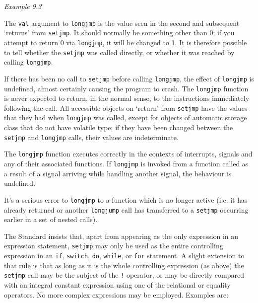   \begin{center}\textit{Example 9.3}\end{center}


  The \texttt{val} argument to \texttt{longjmp} is the value seen in
   the  second and subsequent `returns' from \texttt{setjmp}.  It
   should normally be something other than 0; if  you  attempt  to  return
   0  via \texttt{longjmp},  it will be changed to 1.  It is therefore
   possible to tell whether the \texttt{setjmp} was called directly,  or
   whether it was reached by calling \texttt{longjmp}.


  If there has been no call to \texttt{setjmp} before calling
   \texttt{longjmp}, the effect of \texttt{longjmp} is undefined,
   almost certainly causing the  program  to  crash.   The
   \texttt{longjmp}  function  is  never expected to return, in the normal
   sense, to the instructions immediately following the call.  All accessible
   objects  on `return'  from  \texttt{setjmp}  have  the  values
   that they had when \texttt{longjmp} was called, except for objects of
   automatic  storage class  that  do  not  have  volatile type; if they have
   been changed between the \texttt{setjmp} and \texttt{longjmp} calls,
   their  values are indeterminate.


  The \texttt{longjmp} function executes correctly in the  contexts  of
   interrupts,  signals  and any of their associated functions.  If
   \texttt{longjmp} is invoked from a function called as a result  of
   a   signal  arriving  while  handling  another  signal,  the behaviour is
   undefined.


  It's a serious error to \texttt{longjmp} to a function  which  is  no
   longer  active  (i.e.  it  has  already  returned or another
   \texttt{longjump} call has transferred to a \texttt{setjmp}
   occurring  earlier in a set of nested calls).


  The Standard insists that, apart from appearing as the  only expression
   in  an  expression statement, \texttt{setjmp} may only be used as the
   entire controlling expression in an \texttt{if}, \texttt{switch},
   \texttt{do}, \texttt{while},  or  \texttt{for}  statement.
   A slight extension to that rule is  that  as  long  as  it  is  the  whole
   controlling expression  (as above) the \texttt{setjmp} call may be the
   subject of the \texttt{!}   operator,  or  may  be  directly  compared
   with  an integral  constant expression using one of the relational or
   equality operators.  No  more  complex  expressions  may  be employed.
   Examples are:


